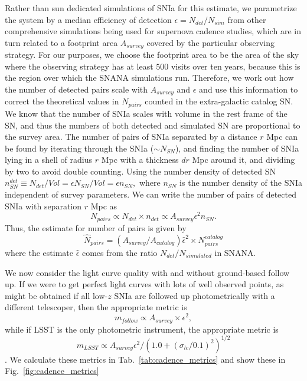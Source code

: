 \documentclass[a4paper,10pt]{article}
\begin{document}
Rather than sun dedicated simulations of SNIa for this estimate, we parametrize the system by a median efficiency of detection $\epsilon = N_{det}/N_{sim}$ from other comprehensive simulations being used for supernova cadence studies, which are in turn related to a footprint area $A_{survey}$ covered by the particular observing strategy. For our purposes, we choose the footprint area to be the area of the sky where the observing strategy has at least $500$ visits over ten years, because this is the region over which the SNANA simulations run.
Therefore, we work out how the number of detected pairs scale with $A_{survey}$ and $\epsilon$ and use this information to correct the theoretical values in $N_{pairs}$ counted in the extra-galactic catalog SN. We know that the number of SNIa scales with volume in the rest frame of the SN, and thus the numbers of both detected and simulated SN are proportional to the survey area. The number of pairs of SNIa separated by a distance $r$ Mpc can be found by iterating through the SNIa ($\sim N_{SN}$), and finding the number of SNIa lying in a shell of radius $r$ Mpc with a thickness $dr$ Mpc around it, and dividing by two to avoid double counting. Using the number density of detected SN $n^{det}_{SN} \equiv N_{det}/Vol = \epsilon N_{SN}/Vol = \epsilon n_{SN},$ where $n_{SN}$ is the number density of the SNIa independent of survey parameters. We can write the number of pairs of detected SNIa with separation $r$ Mpc as 
    $$
    N_{pairs} \propto N_{det} \times {n_{det}} \propto A_{survey} \epsilon^2 {n_{SN}}.
    $$
Thus, the estimate for number of pairs is given by
$$
    \hat{N}_{pairs} = \left( A_{survey} / A_{catalog} \right)\hat{\epsilon}^2 \times N_{pairs}^{catalog}
    $$
where the estimate $\hat{\epsilon}$ comes from the ratio $N_{det}/ N_{simulated}$ in SNANA. 

We now consider the light curve quality with and without ground-based follow up.
If we were to get perfect light curves with lots of well observed points, as might be obtained if all low-$z$ SNIa are followed up photometrically with a different telescoper, then the appropriate metric is 
\begin{equation}
    m_{follow} \propto A_{survey} \times \epsilon^2,
\end{equation}
while if LSST is the only photometric instrument, the appropriate metric is
\begin{equation}
    m_{LSST} \propto A_{survey} \epsilon^2 /(1.0 + \left(\sigma_{lc}/0.1\right)^2)^{1/2}
\end{equation}. We calculate these metrics in Tab.~\ref{tab:cadence_metrics} and show these in Fig.~\ref{fig:cadence_metrics}
\end{document}
